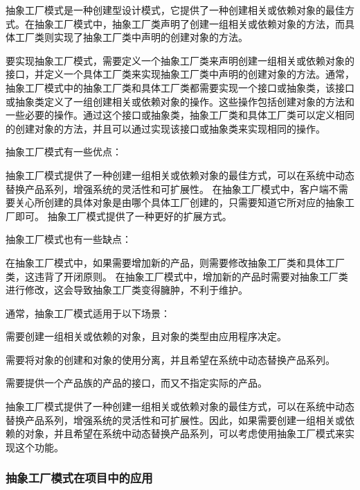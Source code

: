 \documentclass[cn,black,12pt,normal]{elegantnote}
\begin{document}
抽象工厂模式是一种创建型设计模式，它提供了一种创建相关或依赖对象的最佳方式。在抽象工厂模式中，抽象工厂类声明了创建一组相关或依赖对象的方法，而具体工厂类则实现了抽象工厂类中声明的创建对象的方法。

要实现抽象工厂模式，需要定义一个抽象工厂类来声明创建一组相关或依赖对象的接口，并定义一个具体工厂类来实现抽象工厂类中声明的创建对象的方法。通常，抽象工厂模式中的抽象工厂类和具体工厂类都需要实现一个接口或抽象类，该接口或抽象类定义了一组创建相关或依赖对象的操作。这些操作包括创建对象的方法和一些必要的操作。通过这个接口或抽象类，抽象工厂类和具体工厂类可以定义相同的创建对象的方法，并且可以通过实现该接口或抽象类来实现相同的操作。

抽象工厂模式有一些优点：

抽象工厂模式提供了一种创建一组相关或依赖对象的最佳方式，可以在系统中动态替换产品系列，增强系统的灵活性和可扩展性。
在抽象工厂模式中，客户端不需要关心所创建的具体对象是由哪个具体工厂创建的，只需要知道它所对应的抽象工厂即可。
抽象工厂模式提供了一种更好的扩展方式。

抽象工厂模式也有一些缺点：

在抽象工厂模式中，如果需要增加新的产品，则需要修改抽象工厂类和具体工厂类，这违背了开闭原则。
在抽象工厂模式中，增加新的产品时需要对抽象工厂类进行修改，这会导致抽象工厂类变得臃肿，不利于维护。

通常，抽象工厂模式适用于以下场景：

需要创建一组相关或依赖的对象，且对象的类型由应用程序决定。

需要将对象的创建和对象的使用分离，并且希望在系统中动态替换产品系列。

需要提供一个产品族的产品的接口，而又不指定实际的产品。

抽象工厂模式提供了一种创建一组相关或依赖对象的最佳方式，可以在系统中动态替换产品系列，增强系统的灵活性和可扩展性。因此，如果需要创建一组相关或依赖的对象，并且希望在系统中动态替换产品系列，可以考虑使用抽象工厂模式来实现这个功能。

\subsubsection{抽象工厂模式在项目中的应用}
\end{document}
